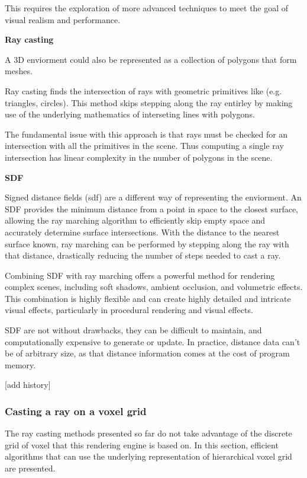 This requires the exploration of more advanced techniques to meet the goal of visual realism and performance.

\vspace{0.5cm}
\textbf{Ray casting}

A 3D enviorment could also be represented as a collection of polygons that form meshes.

Ray casting finds the intersection of rays with geometric primitives like (e.g. triangles, circles). This method skips stepping along the ray entirley by making use of the underlying mathematics of interseting lines with polygons.

The fundamental issue with this approach is that rays must be checked for an intersection with all the primitives in the scene. Thus computing a single ray intersection has linear complexity in the number of polygons in the scene.

\vspace{0.5cm}
\label{def:sdf}
\textbf{SDF}

Signed distance fields (\acrshort{sdf}) are a different way of representing the enviorment. An SDF provides the minimum distance from a point in space to the closest surface, allowing the ray marching algorithm to efficiently skip empty space and accurately determine surface intersections.
With the distance to the nearest surface known, ray marching can be performed by stepping along the ray with that distance, drastically reducing the number of steps needed to cast a ray.

Combining SDF with ray marching offers a powerful method for rendering complex scenes, including soft shadows, ambient occlusion, and volumetric effects.
This combination is highly flexible and can create highly detailed and intricate visual effects, particularly in procedural rendering and visual effects.

SDF are not without drawbacks, they can be difficult to maintain, and computationally expensive to generate or update. In practice, distance data can't be of arbitrary size, as that distance information comes at the cost of program memory.

[add history]

\subsubsection{Casting a ray on a voxel grid}
The ray casting methods presented so far do not take advantage of the discrete grid of voxel that this rendering engine is based on. In this section, efficient algorithms that can use the underlying representation of hierarchical voxel grid are presented.

